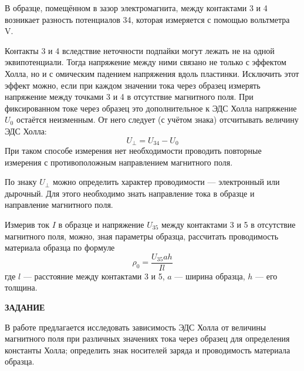 \documentclass[a4paper,12pt]{article} %
\begin{document}
В образце, помещённом в зазор электромагнита, между контактами 3
и 4 возникает разность потенциалов 34, которая измеряется с помощью
вольтметра V.

Контакты 3 и 4 вследствие неточности подпайки могут лежать не на
одной эквипотенциали. Тогда напряжение между ними связано не только с эффектом Холла, но и с омическим падением напряжения вдоль
пластинки. Исключить этот эффект можно, если при каждом значении тока через образец измерять напряжение между точками 3 и 4 в отсутствие магнитного поля. При фиксированном токе через образец это дополнительное к ЭДС Холла напряжение $U_0$ остаётся неизменным. От него следует (с учётом знака)
отсчитывать величину ЭДС Холла:
\begin{equation}
U_\perp = U_{34} - U_0
\end{equation}
При таком способе измерения нет необходимости проводить повторные
измерения с противоположным направлением магнитного поля.

По знаку $U_\perp$ можно определить характер проводимости — электронный или дырочный. Для этого необходимо знать направление тока в
образце и направление магнитного поля.

Измерив ток $I$ в образце и напряжение $U_{35}$ между контактами 3 и 5
в отсутствие магнитного поля, можно, зная параметры образца, рассчитать проводимость материала образца по формуле
\begin{equation}
\rho_0=\frac{U_{35}ah}{Il}
\end{equation}
где $l$ — расстояние между контактами 3 и 5, $a$ — ширина образца, $h$ —
его толщина.


\begin{center}
\textsf{\textbf{ЗАДАНИЕ}}
\end{center}
В работе предлагается исследовать зависимость ЭДС Холла от величины магнитного поля при различных значениях тока через образец для
определения константы Холла; определить знак носителей заряда и проводимость материала образца.
\end{document}
